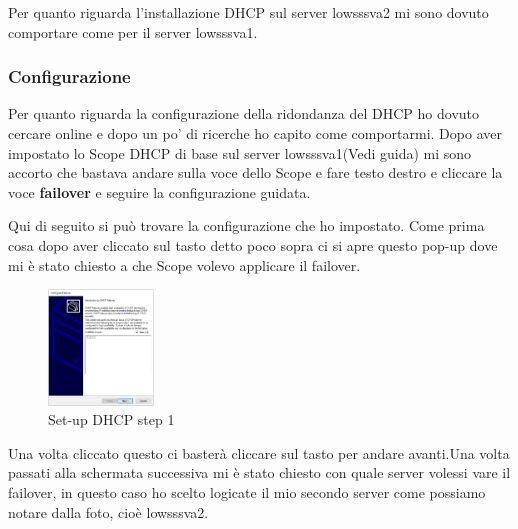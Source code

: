\documentclass[../main.tex]{subfiles}
\begin{document}
Per quanto riguarda l'installazione DHCP sul server lowsssva2 mi sono dovuto comportare come per il server lowsssva1.

\subsubsection{Configurazione}
Per quanto riguarda la configurazione della ridondanza del DHCP ho dovuto cercare online e dopo un po' di ricerche ho capito come comportarmi. Dopo aver impostato lo Scope DHCP di base sul server lowsssva1(Vedi guida) mi sono accorto che bastava andare sulla voce dello Scope e fare testo destro e cliccare la voce \textbf{failover} e seguire la configurazione guidata.


Qui di seguito si può trovare la configurazione che ho impostato. Come prima cosa dopo aver cliccato sul tasto detto poco sopra ci si apre questo pop-up dove mi è stato chiesto a che Scope volevo applicare il failover.

\begin{figure}[h]
    \centering
    \includegraphics[width=0.25\textwidth]{Images/dhcp1.PNG}
    \caption{Set-up DHCP step 1}
\end{figure}


\pagebreak{}
\thispagestyle{header-pages}
Una volta cliccato questo ci basterà cliccare sul tasto per andare avanti.Una volta passati alla schermata successiva mi è stato chiesto con quale server volessi vare il failover, in questo caso ho scelto logicate il mio secondo server come possiamo notare dalla foto, cioè  lowsssva2.
\end{document}
